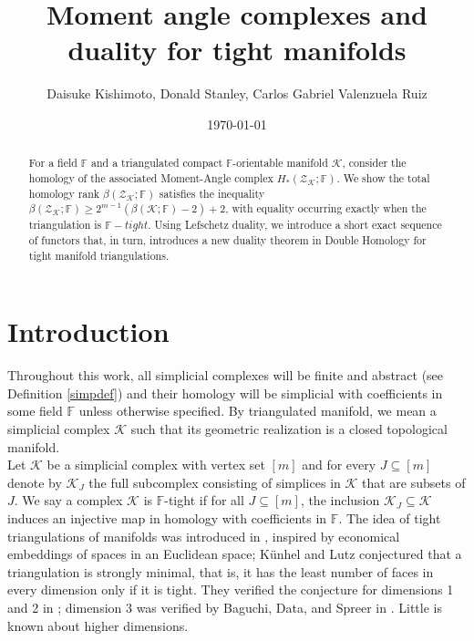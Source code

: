 \documentclass[a4paper]{amsart}
\theoremstyle{definition}
\def\K{\mathcal{K}}
\def\ZZ{\mathcal{Z}}
\def\F{\mathbb{F}}
\begin{document}
\title{Moment angle complexes and duality for tight manifolds}


\author{Daisuke Kishimoto, Donald Stanley, Carlos Gabriel Valenzuela Ruiz}

\date{\today}

\maketitle
\thispagestyle{empty}
\begin{abstract}
For a field $\F$ and a triangulated compact $\F$-orientable manifold $\K$, consider the homology of the associated Moment-Angle complex $H_*(\ZZ_\K;\F)$. We show the total homology rank $\beta(\ZZ_\K;\F)$ satisfies the inequality  $\beta(\ZZ_\K;\F)\geq 2^{m-1}(\beta(\K;\F)-2)+2$, with equality occurring exactly when the triangulation is $\F-tight$. Using Lefschetz duality, we introduce a short exact sequence of functors that, in turn, introduces a new duality theorem in Double Homology for tight manifold triangulations.

\end{abstract}



\maketitle
\setcounter{tocdepth}{1}
\tableofcontents



\section{Introduction}
    
    
    Throughout this work, all simplicial complexes will be finite and abstract (see Definition \ref{simpdef}) and their homology will be simplicial with coefficients in some field $\F$ unless otherwise specified. By triangulated manifold, we mean a simplicial complex $\K$ such that its geometric realization is a closed topological manifold.\\
    
    
    Let $\K$ be a simplicial complex with vertex set $[m]$ and for every $J\subseteq [m]$ denote by $\K_J$ the full subcomplex consisting of simplices in $\K$ that are subsets of  $J$. We say a complex $\K$ is $\F$-tight if for all $J\subseteq [m]$, the inclusion $\K_J\subseteq\K$ induces an injective map in homology with coefficients in $\F$. The idea of tight triangulations of manifolds was introduced in \cite{Kuhnel}, inspired by economical embeddings of spaces in an Euclidean space; Künhel and Lutz conjectured that a triangulation is strongly minimal, that is, it has the least number of faces in every dimension only if it is tight. They verified the conjecture for dimensions 1 and 2 in \cite{KunLutz}; dimension 3 was verified by Baguchi, Data, and Spreer in \cite{BagDatSpreer}. Little is known about higher dimensions.\\
    
\end{document}
